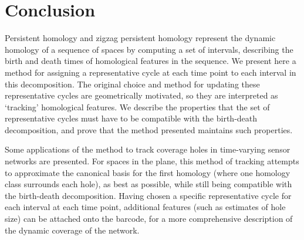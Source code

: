 \documentclass[12pt]{article}
\begin{document}
\section{Conclusion}

Persistent homology and zigzag persistent homology represent the dynamic homology of a sequence of spaces by computing a set of intervals, describing the birth and death times of homological features in the sequence. We present here a method for assigning a representative cycle at each time point to each interval in this decomposition. The original choice and method for updating these representative cycles are geometrically motivated, so they are interpreted as `tracking' homological features. We describe the properties that the set of representative cycles must have to be compatible with the birth-death decomposition, and prove that the method presented maintains such properties.

Some applications of the method to track coverage holes in time-varying sensor networks are presented. For spaces in the plane, this method of tracking attempts to approximate the canonical basis for the first homology (where one homology class surrounds each hole), as best as possible, while still being compatible with the birth-death decomposition. Having chosen a specific representative cycle for each interval at each time point, additional features (such as estimates of hole size) can be attached onto the barcode, for a more comprehensive description of the dynamic coverage of the network.





\end{document}
